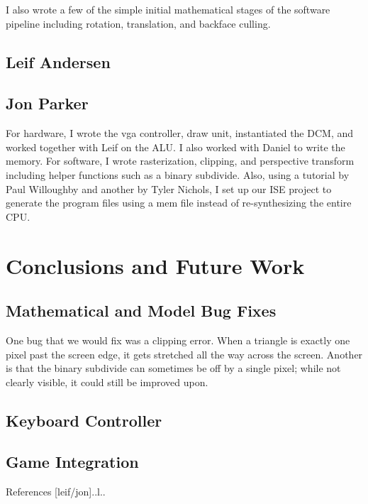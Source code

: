 \documentclass[onecolumn]{IEEEtran}
\begin{document}
I also wrote a few of the simple initial mathematical stages of the software pipeline including rotation, translation, and backface culling.

\subsection{Leif Andersen}

\subsection{Jon Parker}
For hardware, I wrote the vga controller, draw unit, instantiated the DCM, and worked together with Leif on the ALU.  I also worked with Daniel to write the memory.  For software, I wrote rasterization, clipping, and perspective transform including helper functions such as a binary subdivide.  Also, using a tutorial by Paul Willoughby and another by Tyler Nichols, I set up our ISE project to generate the program files using a mem file instead of re-synthesizing the entire CPU.


\section{Conclusions and Future Work}
\subsection{Mathematical and Model Bug Fixes}
One bug that we would fix was a clipping error. When a triangle is exactly one pixel past the screen edge, it gets stretched all the way across the screen.  Another is that the binary subdivide can sometimes be off by a single pixel; while not clearly visible, it could still be improved upon.

\subsection{Keyboard Controller}

\subsection{Game Integration}

References [leif/jon]..l..
\end{document}

